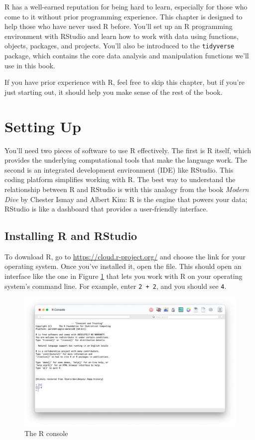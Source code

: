 \documentclass[
]{book}
\begin{document}
R has a well-earned reputation for being hard to learn, especially for those who come to it without prior programming experience. This chapter is designed to help those who have never used R before. You'll set up an R programming environment with RStudio and learn how to work with data using functions, objects, packages, and projects. You'll also be introduced to the \texttt{tidyverse} package, which contains the core data analysis and manipulation functions we'll use in this book.

If you have prior experience with R, feel free to skip this chapter, but if you're just starting out, it should help you make sense of the rest of the book.

\hypertarget{setting-up}{%
\section*{Setting Up}\label{setting-up}}

You'll need two pieces of software to use R effectively. The first is R itself, which provides the underlying computational tools that make the language work. The second is an integrated development environment (IDE) like RStudio. This coding platform simplifies working with R. The best way to understand the relationship between R and RStudio is with this analogy from the book \emph{Modern Dive} by Chester Ismay and Albert Kim: R is the engine that powers your data; RStudio is like a dashboard that provides a user-friendly interface.

\hypertarget{installing-r-and-rstudio}{%
\subsection{Installing R and RStudio}\label{installing-r-and-rstudio}}

To download R, go to \url{https://cloud.r-project.org/} and choose the link for your operating system. Once you've installed it, open the file. This should open an interface like the one in Figure \ref{fig:r-console} that lets you work with R on your operating system's command line. For example, enter \texttt{2\ +\ 2}, and you should see \texttt{4}.

\begin{figure}
\includegraphics[width=1\linewidth]{assets/r-console} \caption{The R console}\label{fig:r-console}
\end{figure}
\end{document}
